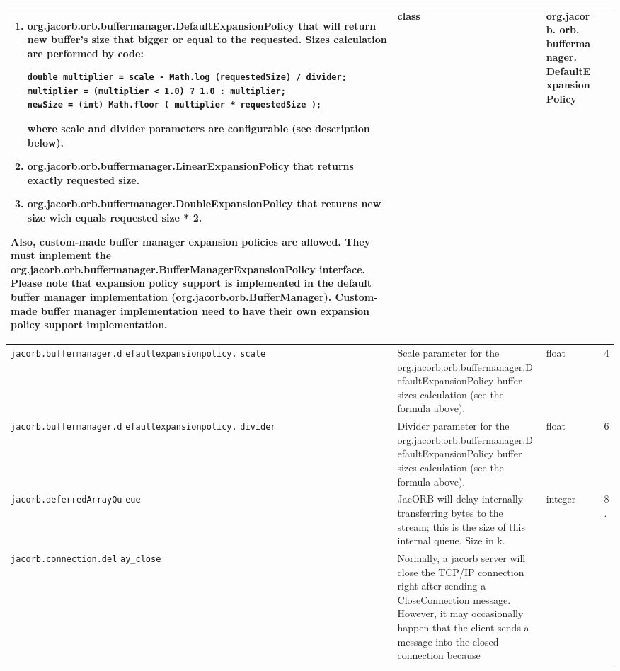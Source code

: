 \begin{small}
\begin{longtable}{|p{5cm}|p{7.5cm}|p{1.5cm}|p{1.5cm}|}
\begin{enumerate}
\item org.jacorb.orb.buffermanager.DefaultExpansionPolicy that will
    return new buffer's size that bigger or equal to the requested.
    Sizes calculation are performed by code:
\begin{tiny}
\begin{verbatim}
double multiplier = scale - Math.log (requestedSize) / divider;
multiplier = (multiplier < 1.0) ? 1.0 : multiplier;
newSize = (int) Math.floor ( multiplier * requestedSize );
\end{verbatim}
\end{tiny}
     where scale and divider parameters are configurable (see description
     below).
\item org.jacorb.orb.buffermanager.LinearExpansionPolicy that returns exactly
     requested size.
\item org.jacorb.orb.buffermanager.DoubleExpansionPolicy that returns new
     size wich equals requested size * 2.
\end{enumerate}
Also, custom-made buffer manager expansion policies are allowed. They must
implement the org.jacorb.orb.buffermanager.BufferManagerExpansionPolicy
interface. Please note that expansion policy support is implemented in the
default buffer manager implementation (org.jacorb.orb.BufferManager).
Custom-made buffer manager implementation need to have their own expansion
policy support implementation.
& class & org.jacorb.
orb.
buffermanager.
DefaultExpansionPolicy \\
\hline
\verb"jacorb.buffermanager.d"
\verb"efaultexpansionpolicy."
\verb"scale" & Scale parameter for the org.jacorb.orb.buffermanager.DefaultExpansionPolicy
buffer sizes calculation (see the formula above).
 & float & 4 \\
\hline
\verb"jacorb.buffermanager.d"
\verb"efaultexpansionpolicy."
\verb"divider" & Divider parameter for the org.jacorb.orb.buffermanager.DefaultExpansionPolicy
buffer sizes calculation (see the formula above).
 & float & 6 \\
\hline
\verb"jacorb.deferredArrayQu"
\verb"eue" & JacORB will delay internally transferring bytes to the stream;
this is the size of this internal queue. Size in k. & integer & 8. \\
\hline
\verb"jacorb.connection.del"
\verb"ay_close" & Normally, a jacorb server will close the TCP/IP connection
right after sending a CloseConnection message. However, it may occasionally
happen that the client sends a message into the closed connection because

\end{longtable}
\end{small}
